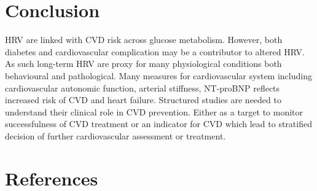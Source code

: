 \documentclass[
  a4paper,
  headsepline=true,
  open=any]{scrbook}
\begin{document}

\hypertarget{conclusion}{%
\chapter{Conclusion}\label{conclusion}}

HRV are linked with CVD risk across glucose metabolism. However, both
diabetes and cardiovascular complication may be a contributor to altered
HRV. As such long-term HRV are proxy for many physiological conditions
both behavioural and pathological. Many measures for cardiovascular
system including cardiovascular autonomic function, arterial stiffness,
NT-proBNP reflects increased risk of CVD and heart failure. Structured
studies are needed to understand their clinical role in CVD prevention.
Either as a target to monitor successfulness of CVD treatment or an
indicator for CVD which lead to stratified decision of further
cardiovascular assessment or treatment.


\hypertarget{references}{%
\chapter*{References}\label{references}}

\end{document}
